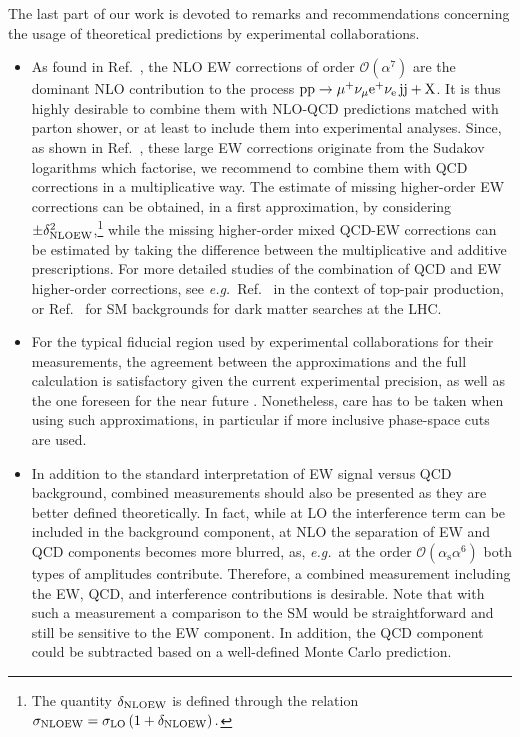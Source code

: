 \documentclass[twocolumn,epjc3]{svjour3} %
\newcommand{\Pj}{\ensuremath{\text{j}}\xspace}
\newcommand{\Pp}{\ensuremath{\text{p}}\xspace}
\newcommand{\alphas}{\ensuremath{\alpha_\text{s}}\xspace}
\begin{document}
The last part of our work is devoted to 
 remarks and recommendations concerning the usage of theoretical predictions by experimental collaborations.
\begin{itemize}
    \item As found in Ref.~\cite{Biedermann:2017bss}, the NLO EW corrections of order $\mathcal{O}{\left(\alpha^{7}\right)}$ are 
        the dominant NLO contribution to the process $\Pp\Pp\to\mu^+\nu_\mu{\rm e}^+\nu_{\rm e}\,\Pj\Pj+\mathrm{X}$.
        It is thus highly desirable to combine them with NLO-QCD predictions matched with parton shower, or at least to include them into experimental analyses. 
        Since, as shown in Ref.~\cite{Biedermann:2016yds}, 
        these large EW corrections originate from the Sudakov logarithms which factorise, we recommend to combine them with QCD 
        corrections in a multiplicative way. The estimate of missing higher-order EW corrections can be obtained, 
        in a first approximation, by considering $\pm \delta^2_{\rm NLO EW}$,\footnote{The quantity $\delta_{\rm NLO EW}$ is defined through the relation $\sigma_{\rm NLO EW} = \sigma_{\rm LO} \left(1+ \delta_{\rm NLO EW}\right).$} while the missing higher-order mixed QCD-EW corrections 
        can be estimated by taking the difference between the multiplicative and additive prescriptions.
        For more detailed studies of the combination of QCD and EW higher-order corrections, see
        \emph{e.g.}\, Ref.~\cite{Czakon:2017wor} in the context of top-pair production, or Ref.~\cite{Lindert:2017olm} for SM 
        backgrounds for dark matter searches at the LHC.
        
    \item For the typical fiducial region used by experimental collaborations for their measurements, 
        the agreement between the approximations and the full calculation is satisfactory given 
        the current experimental precision, as well as the one foreseen for the near future \cite{CMSCollaboration:2015zni,CMS:2016rcn,ATL-PHYS-PUB-2017-023}.
        Nonetheless, care has to be taken when using such approximations, in particular if more inclusive phase-space cuts are used.

    \item In addition to the standard interpretation of EW signal versus QCD background, 
        combined measurements should also be presented as they are better defined theoretically. In fact, while at LO 
        the interference term can be included in the background component, at NLO the separation of EW and QCD components becomes more blurred, as, \emph{e.g.}\,
        at the order $\mathcal{O}{\left(\alphas\alpha^{6}\right)}$ both types of amplitudes contribute.
        Therefore, a combined measurement including the EW, QCD, and interference contributions is desirable.
        Note that with such a measurement a comparison to the SM would
        be straightforward and still be sensitive to the EW component.
        In addition, the QCD component could be subtracted based on a
        well-defined Monte Carlo prediction.


\end{itemize}
\end{document}
